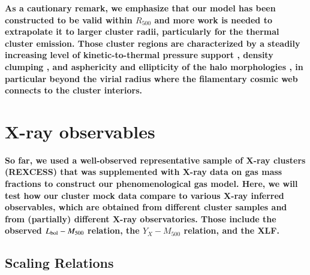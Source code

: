\documentclass[useAMS,usenatbib]{mn2e}
\begin{document}
{\bf As a cautionary remark, we emphasize that our model has been constructed to
  be valid within $R_{500}$ and more work is needed to extrapolate it to larger
  cluster radii, particularly for the thermal cluster emission.  Those cluster
  regions are characterized by a steadily increasing level of kinetic-to-thermal
  pressure support \citep[e.g.,][]{2009ApJ...705.1129L, 2012ApJ...758...74B},
  density clumping \citep{2011ApJ...731L..10N, 2012arXiv1209.4082B}, and
  asphericity and ellipticity of the halo morphologies
  \citep{2012arXiv1209.4082B}, in particular beyond the virial radius where the
  filamentary cosmic web connects to the cluster interiors.}


\section{X-ray  observables}
\label{sec:4}

{\bf So far, we used a well-observed representative sample of X-ray clusters
(REXCESS) that was supplemented with X-ray data on gas mass fractions to construct
our phenomenological gas model.  Here, we will test how our cluster mock data
compare to various X-ray inferred observables, which are obtained from different
cluster samples and from (partially) different X-ray observatories. Those
include the observed $L_{{\mathrm{bol}}} - M_{500}$ relation, the $Y_X - M_{500}$
relation, and the XLF.}

\subsection{Scaling Relations}
\label{sec:Xscaling}
\end{document}
